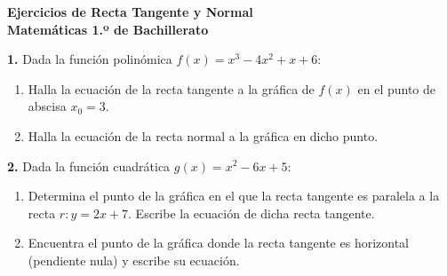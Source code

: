 ﻿\documentclass[11pt,a4paper]{article}
\begin{document}
\pagestyle{empty}

\begin{center}
    {\LARGE \textbf{Ejercicios de Recta Tangente y Normal}}\\[4pt]
    {\large \textbf{Matemáticas 1.º de Bachillerato}}
\end{center}

\vspace{0.4cm}
\noindent\textbf{1.} Dada la función polinómica $f(x) = x^3 - 4x^2 + x + 6$:
\begin{enumerate}[label=\textbf{\alph*)}, leftmargin=2em, itemsep=6pt]
    \item Halla la ecuación de la recta tangente a la gráfica de $f(x)$ en el punto de abscisa $x_0 = 3$.
    \item Halla la ecuación de la recta normal a la gráfica en dicho punto.
\end{enumerate}

\vspace{0.6cm}
\noindent\textbf{2.} Dada la función cuadrática $g(x) = x^2 - 6x + 5$:
\begin{enumerate}[label=\textbf{\alph*)}, leftmargin=2em, itemsep=6pt]
    \item Determina el punto de la gráfica en el que la recta tangente es paralela a la recta $r: y = 2x + 7$. Escribe la ecuación de dicha recta tangente.
    \item Encuentra el punto de la gráfica donde la recta tangente es horizontal (pendiente nula) y escribe su ecuación.
\end{enumerate}
\end{document}
